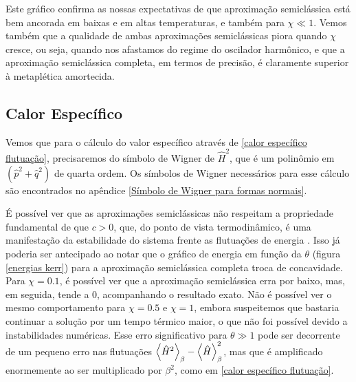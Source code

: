 \documentclass[
	12pt,
	oneside,			%
	a4paper,			%
	english,			%
	brazil				%
	]{abntex2}
\theoremstyle{definition}
\begin{document}
Este gráfico confirma as nossas expectativas de que aproximação semiclássica está bem ancorada em baixas e em altas temperaturas, e também para $\chi \ll 1$. Vemos também que a qualidade de ambas aproximações semiclássicas piora quando $\chi$ cresce, ou seja, quando nos afastamos do regime do oscilador harmônico, e que a aproximação semiclássica completa, em termos de precisão, é claramente superior à metaplética amortecida.

\subsection{Calor Específico}

Vemos que para o cálculo do valor específico através de \eqref{calor específico flutuação}, precisaremos do símbolo de Wigner de $\hat{H}^2$, que é um polinômio em $\left( \hat{p}^2+\hat{q}^2\right)$ de quarta ordem. Os símbolos de Wigner necessários para esse cálculo são encontrados no apêndice \ref{Símbolo de Wigner para formas normais}.

É possível ver que as aproximações semiclássicas não respeitam a propriedade fundamental de que $c>0$, que, do ponto de vista termodinâmico, é uma manifestação da estabilidade do sistema frente as flutuações de energia \cite{callen1991thermodynamics}. Isso já poderia ser antecipado ao notar que o gráfico de energia em função da $\theta$ (figura \ref{energias kerr}) para a aproximação semiclássica completa troca de concavidade. Para $\chi = 0.1$, é possível ver que a aproximação semiclássica erra por baixo, mas, em seguida, tende a $0$, acompanhando o resultado exato. Não é possível ver o mesmo comportamento para $\chi=0.5$ e $\chi = 1$, embora suspeitemos que bastaria continuar a solução por um tempo térmico maior, o que não foi possível devido a instabilidades numéricas. Esse erro significativo para $\theta \gg 1$ pode ser decorrente de um pequeno erro nas flutuações $\expval{\hat{H}^2}_\beta - \expval{\hat{H}}_\beta^2$, mas que é amplificado enormemente ao ser multiplicado por $\beta^2$, como em \eqref{calor específico flutuação}.
\end{document}
